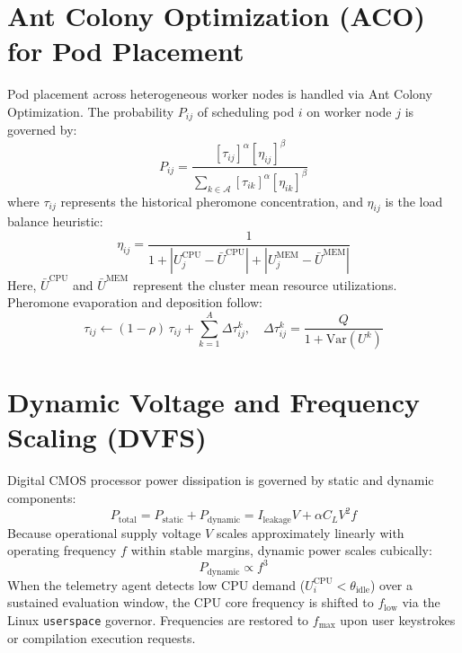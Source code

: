 \documentclass[12pt,a4paper]{report}
\begin{document}
\section{Ant Colony Optimization (ACO) for Pod Placement}
Pod placement across heterogeneous worker nodes is handled via Ant Colony Optimization. The probability $P_{ij}$ of scheduling pod $i$ on worker node $j$ is governed by:
\begin{equation}
    P_{ij} = \frac{[\tau_{ij}]^\alpha [\eta_{ij}]^\beta}{\sum_{k \in \mathcal{A}} [\tau_{ik}]^\alpha [\eta_{ik}]^\beta}
\end{equation}
where $\tau_{ij}$ represents the historical pheromone concentration, and $\eta_{ij}$ is the load balance heuristic:
\begin{equation}
    \eta_{ij} = \frac{1}{1 + |U_j^{\text{CPU}} - \bar{U}^{\text{CPU}}| + |U_j^{\text{MEM}} - \bar{U}^{\text{MEM}}|}
\end{equation}
Here, $\bar{U}^{\text{CPU}}$ and $\bar{U}^{\text{MEM}}$ represent the cluster mean resource utilizations. Pheromone evaporation and deposition follow:
\begin{equation}
    \tau_{ij} \leftarrow (1 - \rho)\,\tau_{ij} + \sum_{k=1}^A \Delta \tau_{ij}^k, \quad \Delta \tau_{ij}^k = \frac{Q}{1 + \text{Var}(U^k)}
\end{equation}

\section{Dynamic Voltage and Frequency Scaling (DVFS)}
Digital CMOS processor power dissipation is governed by static and dynamic components:
\begin{equation}
    P_{\text{total}} = P_{\text{static}} + P_{\text{dynamic}} = I_{\text{leakage}} V + \alpha C_L V^2 f
\end{equation}
Because operational supply voltage $V$ scales approximately linearly with operating frequency $f$ within stable margins, dynamic power scales cubically:
\begin{equation}
    P_{\text{dynamic}} \propto f^3
\end{equation}
When the telemetry agent detects low CPU demand ($U_i^{\text{CPU}} < \theta_{\text{idle}}$) over a sustained evaluation window, the CPU core frequency is shifted to $f_{\text{low}}$ via the Linux \texttt{userspace} governor. Frequencies are restored to $f_{\max}$ upon user keystrokes or compilation execution requests.

\end{document}
